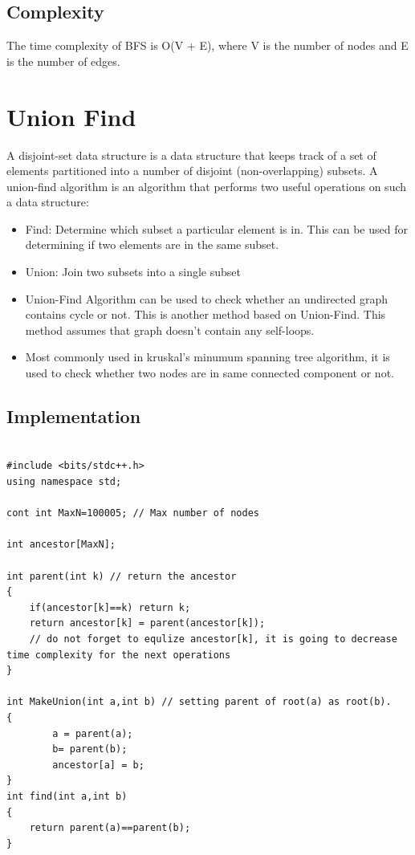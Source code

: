 \documentclass[12pt]{article}
\begin{document}
\subsection{Complexity}
The time complexity of BFS is O(V + E), where V is the number of nodes and E is the number of edges.


\section{Union Find}
    A disjoint-set data structure is a data structure that keeps track of a set of elements partitioned into a number of disjoint (non-overlapping) subsets. A union-find algorithm is an algorithm that performs two useful operations on such a data structure: \cite{11,12}
    \begin{itemize}
        \item Find: Determine which subset a particular element is in. This can be used for determining if two elements are in the same subset.

        \item Union: Join two subsets into a single subset
        
        \item Union-Find Algorithm can be used to check whether an undirected graph contains cycle or not. This is another method based on Union-Find. This method assumes that graph doesn’t contain any self-loops. 
        \item Most commonly used in kruskal's minumum spanning tree algorithm, it is used to check whether two nodes are in same connected component or not. \cite{10}
    \end{itemize}
    \subsection{Implementation}
    
\begin{verbatim}

#include <bits/stdc++.h>
using namespace std;

cont int MaxN=100005; // Max number of nodes

int ancestor[MaxN];

int parent(int k) // return the ancestor
{
    if(ancestor[k]==k) return k;
    return ancestor[k] = parent(ancestor[k]); 
    // do not forget to equlize ancestor[k], it is going to decrease time complexity for the next operations
}

int MakeUnion(int a,int b) // setting parent of root(a) as root(b).
{
        a = parent(a);
        b= parent(b);
        ancestor[a] = b;
}
int find(int a,int b)
{
    return parent(a)==parent(b);
}
\end{verbatim}
\end{document}

